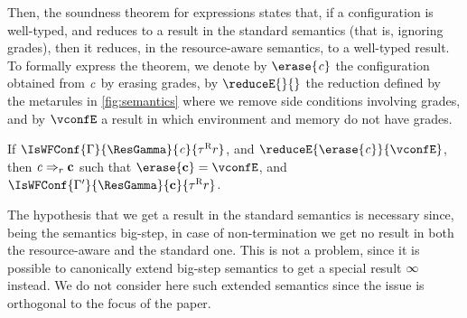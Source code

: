 Then, the soundness theorem for expressions states that, if a configuration is well-typed, and reduces to a result in the standard semantics (that is, ignoring grades), then  it reduces, in the resource-aware semantics, to a well-typed result. 
To formally express the theorem, we denote by $\erase{\conf}$ the configuration obtained from $\mathit{c}$ by erasing grades, by $\reduceE{}{}$ the reduction defined by the metarules in \cref{fig:semantics} where we remove side conditions involving grades, and by $\vconfE$ a result in which environment and memory do not have grades.
\begin{theorem}[Soundness]
\label{theo:sound-exp}
If $\IsWFConf{\Gamma}{\ResGamma}{\conf}{\Graded{\tau}{\Rgr}{\rgr}}$, and
$\reduceE{\erase{\conf}}{\vconfE}$, then $\mathit{c}\Rightarrow_{r}\mathbf{c}$ such that $\erase{\vconf}=\vconfE$, and $\IsWFConf{\Gamma'}{\ResGamma}{\vconf}{\Graded{\tau}{\Rgr}{\rgr}}$.
\end{theorem}
The hypothesis that we get a result in the standard semantics is necessary since, being the semantics big-step, in case of non-termination we get no result in both the resource-aware and the standard one. 
This is not a problem, since it is possible to canonically extend big-step semantics \cite{Dagnino22,BianchiniDGZ23oopsla} to get a special result $\infty$ instead.  We do not consider here such extended semantics since the issue is orthogonal to the focus of the paper. 

